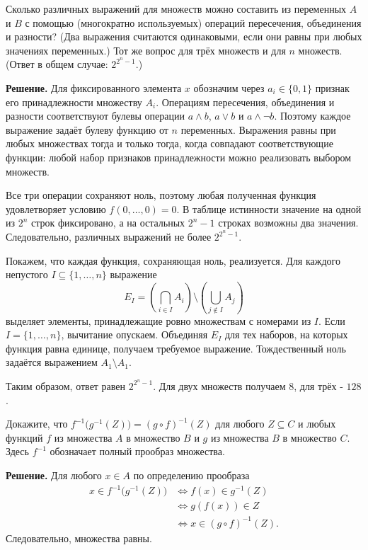 \begin{problems}
\item Сколько различных выражений для множеств можно составить из переменных $A$ и $B$ с помощью (многократно используемых) операций пересечения, объединения и разности? (Два выражения считаются одинаковыми, если они равны при любых значениях переменных.) Тот же вопрос для трёх множеств и для $n$ множеств. (Ответ в общем случае: $2^{2^n-1}$.)
\par\smallskip\noindent\textbf{Решение.} Для фиксированного элемента $x$ обозначим через $a_i\in\{0,1\}$ признак его принадлежности множеству $A_i$. Операциям пересечения, объединения и разности соответствуют булевы операции $a\land b$, $a\lor b$ и $a\land\neg b$. Поэтому каждое выражение задаёт булеву функцию от $n$ переменных. Выражения равны при любых множествах тогда и только тогда, когда совпадают соответствующие функции: любой набор признаков принадлежности можно реализовать выбором множеств.
\par Все три операции сохраняют ноль, поэтому любая полученная функция удовлетворяет условию $f(0,\ldots,0)=0$. В таблице истинности значение на одной из $2^n$ строк фиксировано, а на остальных $2^n-1$ строках возможны два значения. Следовательно, различных выражений не более $2^{2^n-1}$.
\par Покажем, что каждая функция, сохраняющая ноль, реализуется. Для каждого непустого $I\subseteq\{1,\ldots,n\}$ выражение
\[
E_I=\left(\bigcap_{i\in I}A_i\right)\setminus\left(\bigcup_{j\notin I}A_j\right)
\]
выделяет элементы, принадлежащие ровно множествам с номерами из $I$. Если $I=\{1,\ldots,n\}$, вычитание опускаем. Объединяя $E_I$ для тех наборов, на которых функция равна единице, получаем требуемое выражение. Тождественный ноль задаётся выражением $A_1\setminus A_1$.
\par Таким образом, ответ равен $2^{2^n-1}$. Для двух множеств получаем $8$, для трёх - $128$.\par

\item Докажите, что $f^{-1}\bigl(g^{-1}(Z)\bigr)=(g\circ f)^{-1}(Z)$ для любого $Z\subseteq C$ и любых функций $f$ из множества $A$ в множество $B$ и $g$ из множества $B$ в множество $C$. Здесь $f^{-1}$ обозначает полный прообраз множества.
\par\smallskip\noindent\textbf{Решение.} Для любого $x\in A$ по определению прообраза
\[
\begin{aligned}
x\in f^{-1}\bigl(g^{-1}(Z)\bigr)
&\iff f(x)\in g^{-1}(Z)\\
&\iff g(f(x))\in Z\\
&\iff x\in(g\circ f)^{-1}(Z).
\end{aligned}
\]
Следовательно, множества равны.\par


\end{problems}
